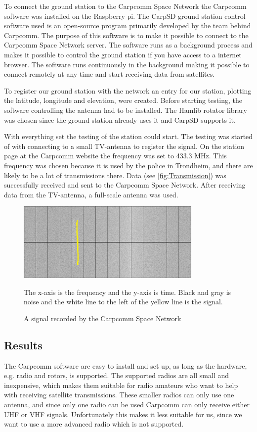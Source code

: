 To connect the ground station to the Carpcomm Space Network the Carpcomm software was installed on the Raspberry pi. The CarpSD ground station control software used is an open-source program primarily developed by the team behind Carpcomm. The purpose of this software is to make it possible to connect to the Carpcomm Space Network server. The software runs as a background process and makes it possible to control the ground station if you have access to a internet browser. The software runs continuously in the background making it possible to connect remotely at any time and start receiving data from satellites.

To register our ground station with the network an entry for our station, plotting the latitude, longitude and elevation, were created. 
Before starting testing, the software controlling the antenna had to be installed. The Hamlib rotator library was chosen since the ground station already uses it and CarpSD supports it. 

With everything set the testing of the station could start. The testing was started of with connecting to a small TV-antenna to register the signal. On the station page at the Carpcomm website the frequency was set to 433.3 MHz. This frequency was chosen because it is used by the police in Trondheim, and there are likely to be a lot of transmissions there. Data (see \autoref{fig:Transmission}) was successfully received and sent to the Carpcomm Space Network. After receiving data from the TV-antenna, a full-scale antenna was used.

\begin{figure}
	\centering
	\includegraphics[width=0.8\textwidth]{Figures/sattelite_transmition}
	\label{fig:Transmission}
	\caption{A signal recorded by the Carpcomm Space Network}
The x-axis is the frequency and the y-axis is time. Black and gray is noise and the white line to the left of the yellow line is the signal.
\end{figure}

\subsection{Results}
The Carpcomm software are easy to install and set up, as long as the hardware, e.g. radio and rotors, is supported. The supported radios are all small and inexpensive, which makes them suitable for radio amateurs who want to help with receiving satellite transmissions. These smaller radios can only use one antenna, and since only one radio can be used Carpcomm can only receive either UHF or VHF signals. Unfortunately this makes it less suitable for us, since we want to use a more advanced radio which is not supported.

